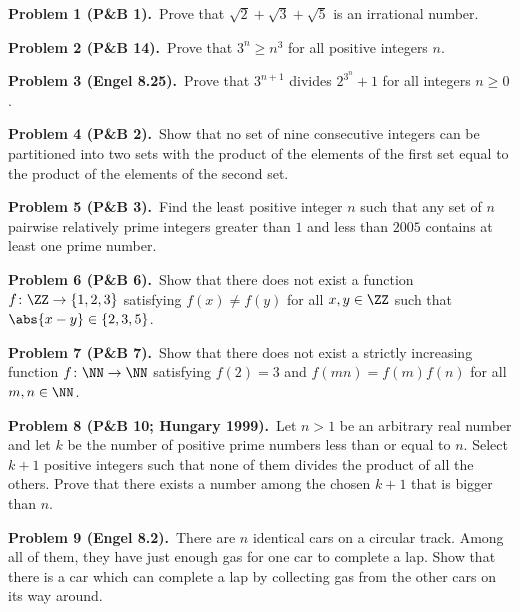 \documentclass[10pt]{scrartcl}
\begin{document}
\begin{prob}\textbf{Problem 1 (P\&B 1).}\ Prove that $\sqrt2 + \sqrt3 + \sqrt5$ is an irrational number.\end{prob}
\begin{prob}\textbf{Problem 2 (P\&B 14).}\ Prove that $3^n \geq n^3$ for all positive integers $n$.\end{prob}
\begin{prob}\textbf{Problem 3 (Engel 8.25).}\ Prove that $3^{n+1}$ divides $2^{3^n} + 1$ for all integers $n \geq 0$.\end{prob}
\begin{prob}\textbf{Problem 4 (P\&B 2).}\ Show that no set of nine consecutive integers can be partitioned into two sets with the product of the elements of the first set equal to the product of the elements of the second set.\end{prob}
\begin{prob}\textbf{Problem 5 (P\&B 3).}\ Find the least positive integer $n$ such that any set of $n$ pairwise relatively prime integers greater than $1$ and less than $2005$ contains at least one prime number.\end{prob}
\begin{prob}\textbf{Problem 6 (P\&B 6).}\ Show that there does not exist a function $f \colon \ZZ \to \{1, 2, 3\}$ satisfying $f(x) \neq f(y)$ for all $x, y \in \ZZ$ such that $\abs{x - y} \in \{2, 3, 5\}$.\end{prob}
\begin{prob}\textbf{Problem 7 (P\&B 7).}\ Show that there does not exist a strictly increasing function $f \colon \NN \to \NN$ satisfying $f(2) = 3$ and $f(mn) = f(m) f(n)$ for all $m, n \in \NN$.\end{prob}
\begin{prob}\textbf{Problem 8 (P\&B 10; Hungary 1999).}\ Let $n > 1$ be an arbitrary real number and let $k$ be the number of positive prime numbers less than or equal to $n$. Select $k + 1$ positive integers such that none of them divides the product of all the others. Prove that there exists a number among the chosen $k + 1$ that is bigger than $n$.\end{prob}
\begin{prob}\textbf{Problem 9 (Engel 8.2).}\ There are $n$ identical cars on a circular track. Among all of them, they have just enough gas for one car to complete a lap. Show that there is a car which can complete a lap by collecting gas from the other cars on its way around.\end{prob}
\end{document}
